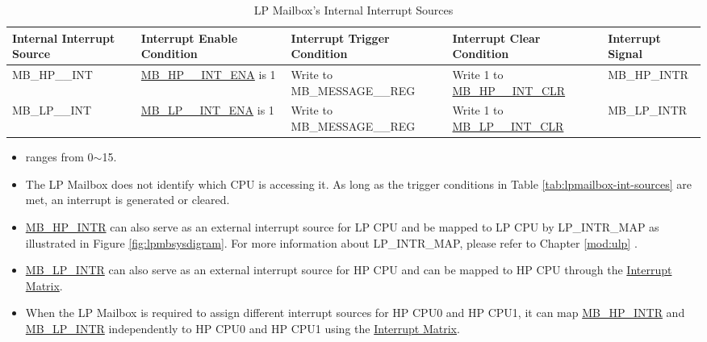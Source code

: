 \documentclass[main\_\_EN.tex]{subfiles}
\begin{document}
\begin{longtable}{ | L{2.3cm} | L{3.8cm} | L{3.9cm} | L{4.2cm} | L{2.2cm} | }
\caption{LP Mailbox's Internal Interrupt Sources} \label{tab:lpmailbox-int-sources}
\\ \hline
{}
\textbf{Internal Interrupt Source} & \textbf{Interrupt Enable Condition} & \textbf{Interrupt Trigger Condition} & \textbf{Interrupt Clear Condition} & \textbf{Interrupt Signal}\\ \hline
\label{int:MBHPmINT} MB\_HP\_\_INT & \hyperref[fielddesc:MBHP0INTENA]{MB\_HP\_\_INT\_ENA} is 1 & Write to MB\_MESSAGE\_\_REG & Write 1 to \hyperref[fielddesc:MBHP0INTCLR]{MB\_HP\_\_INT\_CLR} & MB\_HP\_INTR  \\ \hline
\label{int:MBLPnINT} MB\_LP\_\_INT & \hyperref[fielddesc:MBLP0INTENA]{MB\_LP\_\_INT\_ENA} is 1 & Write to MB\_MESSAGE\_\_REG & Write 1 to \hyperref[fielddesc:MBLP0INTCLR]{MB\_LP\_\_INT\_CLR} & MB\_LP\_INTR  \\ \hline
\end{longtable}
\begin{tiplisting}
\vspace{-2em}
\begin{itemize}
    \item {} ranges from 0$\sim$15.
    \item The LP Mailbox does not identify which CPU is accessing it. As long as the trigger conditions in Table \ref{tab:lpmailbox-int-sources} are met, an interrupt is generated or cleared.
    \item \hyperref[tab:lpmailbox-int-sources]{MB\_HP\_INTR} can also serve as an external interrupt source for LP CPU and be mapped to LP CPU by LP\_INTR\_MAP as illustrated in Figure \ref{fig:lpmbsysdigram}. For more information about LP\_INTR\_MAP, please refer to Chapter \ref{mod:ulp} \textit{}.
    \item\hyperref[tab:lpmailbox-int-sources]{MB\_LP\_INTR} can also serve as an external interrupt source for HP CPU and can be mapped to HP CPU through the \hyperref[mod:intmtrx]{Interrupt Matrix}.
    \item When the LP Mailbox is required to assign different interrupt sources for HP CPU0 and HP CPU1, it can map \hyperref[tab:lpmailbox-int-sources]{MB\_HP\_INTR} and  \hyperref[tab:lpmailbox-int-sources]{MB\_LP\_INTR} independently to HP CPU0 and HP CPU1 using the \hyperref[mod:intmtrx]{Interrupt Matrix}.
\end{itemize}
\end{tiplisting}
\end{document}
